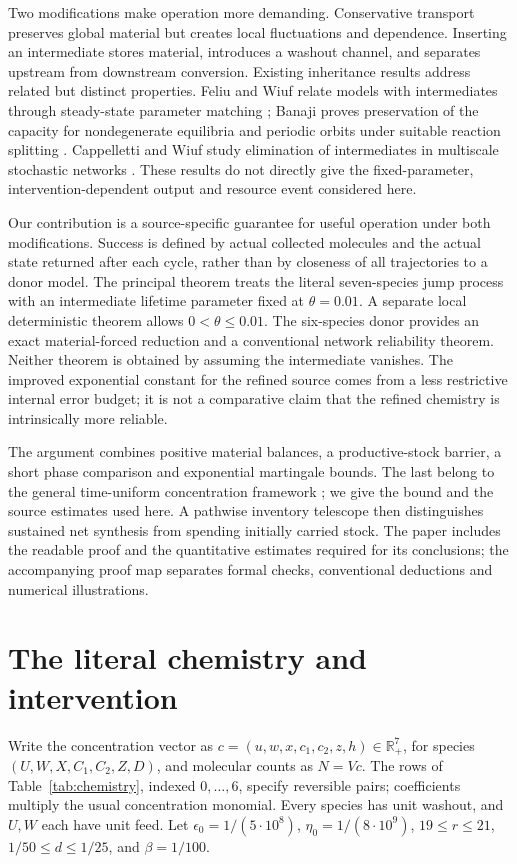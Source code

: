 \documentclass[11pt]{article}
\theoremstyle{definition}\newtheorem{definition}[theorem]{Definition}
\newcommand{\R}{\mathbb R}
\begin{document}
Two modifications make operation more demanding. Conservative transport preserves
global material but creates local fluctuations and dependence. Inserting an intermediate
stores material, introduces a washout channel, and separates upstream from downstream
conversion. Existing inheritance results address related but distinct properties.
Feliu and Wiuf relate models with intermediates through steady-state parameter matching
\citep{feliu2013}; Banaji proves preservation of the capacity for nondegenerate
equilibria and periodic orbits under suitable reaction splitting \citep{banaji2023}.
Cappelletti and Wiuf study elimination of intermediates in multiscale stochastic
networks \citep{cappelletti2016}. These results do not directly give the fixed-parameter,
intervention-dependent output and resource event considered here.

Our contribution is a source-specific guarantee for useful operation under both
modifications. Success is defined by actual collected molecules and the actual state
returned after each cycle, rather than by closeness of all trajectories to a donor model.
The principal theorem treats the literal seven-species jump process with an intermediate
lifetime parameter fixed at $\theta=0.01$. A separate local deterministic theorem allows
$0<\theta\le0.01$. The six-species donor provides an exact material-forced reduction
and a conventional network reliability theorem. Neither theorem is obtained by assuming
the intermediate vanishes. The improved exponential constant for the refined source
comes from a less restrictive internal error budget; it is not a comparative claim
that the refined chemistry is intrinsically more reliable.

The argument combines positive material balances, a productive-stock barrier, a short
phase comparison and exponential martingale bounds. The last belong to the general
time-uniform concentration framework \citep{howard2020}; we give the bound and the
source estimates used here. A pathwise inventory telescope then distinguishes sustained
net synthesis from spending initially carried stock. The paper includes the readable
proof and the quantitative estimates required for its conclusions; the accompanying
proof map separates formal checks, conventional deductions and numerical illustrations.

\section{The literal chemistry and intervention}
Write the concentration vector as $c=(u,w,x,c_1,c_2,z,h)\in\R_+^7$,
for species $(U,W,X,C_1,C_2,Z,D)$, and molecular counts as $N=Vc$.
The rows of Table~\ref{tab:chemistry}, indexed $0,\ldots,6$, specify reversible pairs; coefficients multiply the
usual concentration monomial. Every species has unit washout, and $U,W$ each have unit feed.
Let $\epsilon_0=1/(5\cdot10^8)$, $\eta_0=1/(8\cdot10^9)$, $19\le r\le21$, $1/50\le d\le1/25$, and $\beta=1/100$.
\end{document}
